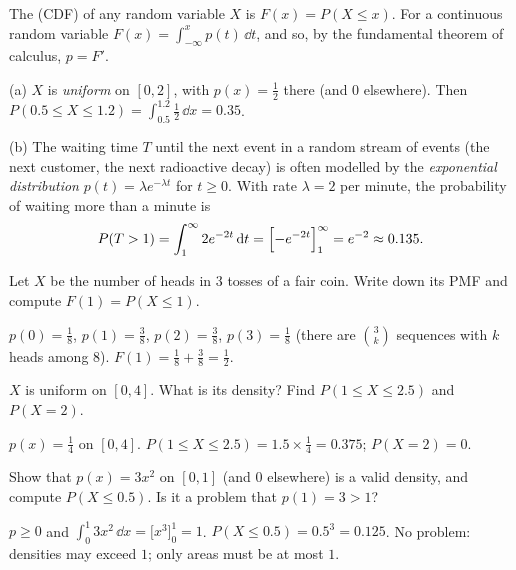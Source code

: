 \begin{definition}\label{def:cdf}
The  (CDF) of any random variable $X$ is
$F(x) = P(X \le x)$. For a continuous random variable
$F(x) = \int_{-\infty}^{x}p(t)\,\dd t$, and so, by the fundamental theorem of
calculus, $p = F'$.
\end{definition}

\begin{example}\label{ex:continuous}
(a) $X$ is \emph{uniform} on $[0, 2]$, with $p(x) = \frac12$ there (and $0$
elsewhere). Then $P(0.5 \le X \le 1.2) = \int_{0.5}^{1.2}\frac12\,\dd x = 0.35$.

(b) The waiting time $T$ until the next event in a random stream of events (the
next customer, the next radioactive decay) is often modelled by the
\emph{exponential distribution} $p(t) = \lambda e^{-\lambda t}$ for $t \ge 0$. With
rate $\lambda = 2$ per minute, the probability of waiting more than a minute is
\[
  P(T > 1) = \int_1^\infty 2e^{-2t}\,\mathrm{d} t = \Bigl[-e^{-2t}\Bigr]_1^\infty
  = e^{-2} \approx 0.135 .
\]
\end{example}

\sectionexercises

\begin{exercise}
Let $X$ be the number of heads in $3$ tosses of a fair coin. Write down its PMF
and compute $F(1) = P(X \le 1)$.
\end{exercise}
\begin{solution}
$p(0) = \tfrac18$, $p(1) = \tfrac38$, $p(2) = \tfrac38$, $p(3) = \tfrac18$ (there are
$\binom3k$ sequences with $k$ heads among $8$). $F(1) = \tfrac18 + \tfrac38 =
\tfrac12$.
\end{solution}

\begin{exercise}
$X$ is uniform on $[0, 4]$. What is its density? Find $P(1 \le X \le 2.5)$ and
$P(X = 2)$.
\end{exercise}
\begin{solution}
$p(x) = \tfrac14$ on $[0, 4]$. $P(1 \le X \le 2.5) = 1.5\times\tfrac14 = 0.375$;
$P(X = 2) = 0$.
\end{solution}

\begin{exercise}
Show that $p(x) = 3x^2$ on $[0, 1]$ (and $0$ elsewhere) is a valid density, and
compute $P(X \le 0.5)$. Is it a problem that $p(1) = 3 > 1$?
\end{exercise}
\begin{solution}
$p \ge 0$ and $\int_0^1 3x^2\,\dd x = \bigl[x^3\bigr]_0^1 = 1$. $P(X \le 0.5) =
0.5^3 = 0.125$. No problem: densities may exceed $1$; only areas must be at most
$1$.
\end{solution}

